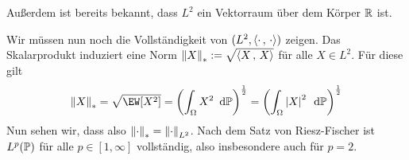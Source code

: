 \begin{exercisePage}
\begin{enumerate}[leftmargin=*, label=(zu \alph*)]
		Außerdem ist bereits bekannt, dass $L^2$ ein Vektorraum über dem Körper $\R$ ist.
		
		Wir müssen nun noch die Vollständigkeit von $(L^2, \scal{\cdot}{\cdot})$ zeigen. Das Skalarprodukt induziert eine Norm $\norm{X}_\ast \defeq \sqrt{\scal{X}{X}}$ für alle $X \in L^2$. Für diese gilt
		\begin{equation*}
			\norm{X}_\ast = \sqrt{\EW[X^2]} = \left( \int_{\Omega} X^2 \diff\P \right)^{\frac{1}{2}} = \left( \int_{\Omega} \abs{X}^2 \diff\P \right)^{\frac{1}{2}}
 		\end{equation*}
 		Nun sehen wir, dass also $\norm{\cdot}_\ast = \norm{\cdot}_{L^2}$. Nach dem Satz von Riesz-Fischer ist $L^p(\P)$ für alle $p \in [1,\infty]$ vollständig, also insbesondere auch für $p = 2$.		
	\end{enumerate}
\end{exercisePage}